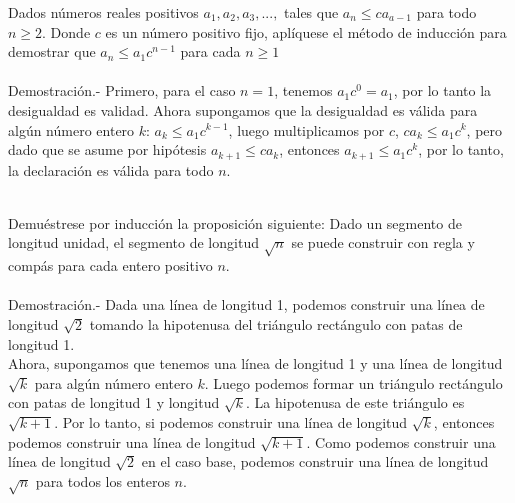\begin{ej}
Dados números reales positivos $a_1,a_2,a_3,...,$ tales que $a_n\leq ca_{a-1}$ para todo $n\geq 2$. Donde $c$ es un número positivo fijo, aplíquese el método de inducción para demostrar que $a_n \leq a_1 c^{n-1}$ para cada $n \geq 1$\\\\
Demostración.- \; Primero, para el caso $n=1$, tenemos $a_1c^0=a_1$, por lo tanto la desigualdad es validad. Ahora supongamos que la desigualdad es válida para algún número entero $k$: $a_k\leq a_1c^{k-1}$, luego multiplicamos por $c$, $ca_k\leq a_1c^k$, pero dado que se asume por hipótesis $a_{k+1} \leq ca_k$, entonces $a_{k+1}\leq a_1c^k$, por lo tanto, la declaración es válida para todo $n$.\\\\
\end{ej}

\begin{ej}
Demuéstrese por inducción la proposición siguiente: Dado un segmento de longitud unidad, el segmento de longitud $\sqrt{n}$ se puede construir con regla y compás para cada entero positivo $n$.\\\\
Demostración.- \; Dada una línea de longitud 1, podemos construir una línea de longitud $\sqrt{2}$ tomando la hipotenusa del triángulo rectángulo con patas de longitud 1.\\
Ahora, supongamos que tenemos una línea de longitud 1 y una línea de longitud $\sqrt{k}$ para algún número entero $k$. Luego podemos formar un triángulo rectángulo con patas de longitud 1 y longitud $\sqrt{k}$. La hipotenusa de este triángulo es $\sqrt{k+1}$. Por lo tanto, si podemos construir una línea de longitud $\sqrt{k}$, entonces podemos construir una línea de longitud $\sqrt{k+1}$. Como podemos construir una línea de longitud $\sqrt{2}$ en el caso base, podemos construir una línea de longitud $\sqrt{n}$ para todos los enteros $n$.\\\\
\end{ej}

